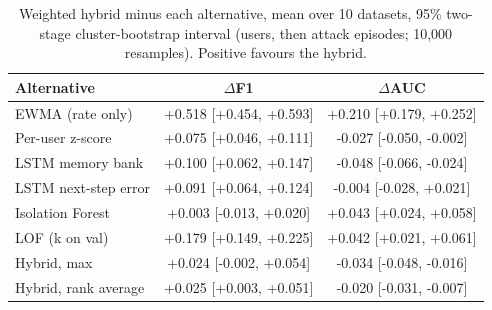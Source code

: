 \begin{table}[t]
\centering
\scriptsize
\caption{Weighted hybrid minus each alternative, mean over 10 datasets, 95\% two-stage cluster-bootstrap interval (users, then attack episodes; 10,000 resamples). Positive favours the hybrid.}
\label{tab:paired}
\begin{tabular}{lcc}
\hline
Alternative & $\Delta$F1 & $\Delta$AUC \\
\hline
EWMA (rate only) & +0.518 [+0.454, +0.593] & +0.210 [+0.179, +0.252] \\
Per-user z-score & +0.075 [+0.046, +0.111] & -0.027 [-0.050, -0.002] \\
LSTM memory bank & +0.100 [+0.062, +0.147] & -0.048 [-0.066, -0.024] \\
LSTM next-step error & +0.091 [+0.064, +0.124] & -0.004 [-0.028, +0.021] \\
Isolation Forest & +0.003 [-0.013, +0.020] & +0.043 [+0.024, +0.058] \\
LOF (k on val) & +0.179 [+0.149, +0.225] & +0.042 [+0.021, +0.061] \\
Hybrid, max & +0.024 [-0.002, +0.054] & -0.034 [-0.048, -0.016] \\
Hybrid, rank average & +0.025 [+0.003, +0.051] & -0.020 [-0.031, -0.007] \\
\hline
\end{tabular}
\end{table}
